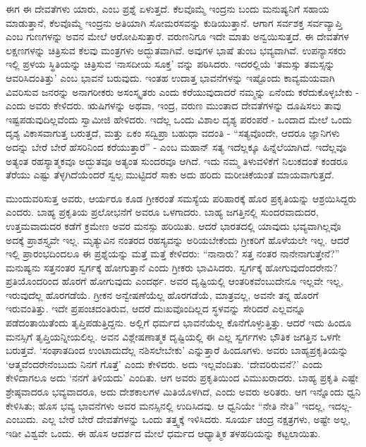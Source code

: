 \newpage

ಈಗ ಈ ದೇವತೆಗಳು ಯಾರು, ಎಂಬ ಪ್ರಶ್ನೆ ಏಳುತ್ತದೆ. ಕೆಲವೊಮ್ಮೆ ಇಂದ್ರನು ಬಂದು ಮನುಷ್ಯನಿಗೆ ಸಹಾಯ ಮಾಡುತ್ತಾನೆ, ಕೆಲವೊಮ್ಮೆ ಇಂದ್ರನು ಅತಿಯಾಗಿ ಸೋಮರಸವನ್ನು ಕುಡಿಯುತ್ತಾನೆ. ಆಗಾಗ ಸರ್ವಶಕ್ತ ಸರ್ವವ್ಯಾಪ್ತಿ ಎಂಬ ಗುಣಗಳನ್ನು ಅವನ ಮೇಲೆ ಆರೋಪಿಸುತ್ತಾರೆ. ವರುಣನಿಗೂ ಇದೇ ಮಾತು ಅನ್ವಯಿಸುತ್ತದೆ. ಈ ದೇವತೆಗಳ ಲಕ್ಷಣಗಳನ್ನು ಚಿತ್ರಿಸುವ ಕೆಲವು ಮಂತ್ರಗಳು ಅದ್ಭುತವಾಗಿವೆ. ಅವುಗಳ ಭಾಷೆ ತುಂಬ ಭವ್ಯವಾಗಿವೆ. ಉಪನ್ಯಾಸಕರು ಇಲ್ಲಿ ಪ್ರಳಯ ಸ್ಥಿತಿಯನ್ನು ಚಿತ್ರಿಸುವ ‘ನಾಸದೀಯ ಸೂಕ್ತ’ ವನ್ನು ಪಠಿಸಿದರು. ಇದರಲ್ಲಿಯೆ ‘ತಮಸ್ಸು ತಮಸ್ಸನ್ನು ಆವರಿಸಿದಂತಿತ್ತು’ ಎಂಬ ಭಾವನೆ ಬರುವುದು. ಇಂತಹ ಉದಾತ್ತ ಭಾವನೆಗಳನ್ನು ಇಷ್ಟೊಂದು ಕಾವ್ಯಮಯವಾಗಿ ವಿವರಿಸುವ ಜನರನ್ನು ಅನಾಗರೀಕರು ಅಸಂಸ್ಕೃತರು ಎಂದು ಕರೆಯುವುದಾದರೆ ನಮ್ಮನ್ನು ಏನೆಂದು ಕರೆದುಕೊಳ್ಳಬೇಕು - ಎಂದು ಅವರು ಕೇಳಿದರು. ಋಷಿಗಳನ್ನು ಅಥವಾ, ಇಂದ್ರ, ವರುಣ ಮುಂತಾದ ದೇವತೆಗಳನ್ನು ದೂಷಿಸಲು ತಾವು ಇಷ್ಟಪಡುವುದಿಲ್ಲವೆಂದು ಸ್ವಾಮೀಜಿ ಹೇಳಿದರು. ಇದೆಲ್ಲ ಒಂದು ವಿಶಾಲ ದೃಶ್ಯ ಪರಂಪರೆ - ಒಂದಾದ ಮೇಲೆ ಒಂದು ದೃಶ್ಯ ವಿಕಾಸವಾಗುತ್ತ ಬರುತ್ತದೆ, ಮತ್ತು ಏಕಂ ಸದ್ವಿಪ್ರಾ ಬಹುಧಾ ವದಂತಿ - “ಸತ್ಯವೊಂದೇ, ಆದರೂ ಜ್ಞಾನಿಗಳು ಅದನ್ನು ಬೇರೆ ಬೇರೆ ಹೆಸರಿನಿಂದ ಕರೆಯುತ್ತಾರೆ” - ಎಂಬ ಮಹಾನ್​ ಸತ್ಯ ಇದೆಲ್ಲಕ್ಕೂ ಹಿನ್ನೆಲೆಯಾಗಿದೆ. ಇದೆಲ್ಲವೂ ಅತ್ಯಂತ ರಹಸ್ಯಾತ್ಮಕವೂ ಅದ್ಭುತವೂ ಅತ್ಯಂತ ಸುಂದರವೂ ಆಗಿದೆ. ಇದು ನಮ್ಮ ತಿಳುವಳಿಕೆಗೆ ನಿಲುಕದಂತೆ ಕಂಡರೂ ತೆರೆಯು ಎಷ್ಟು ತೆಳ್ಳಗಿದೆಯೆಂದರೆ ಸ್ವಲ್ಪ ಮುಟ್ಟಿದರೆ ಸಾಕು ಅದು ಹರಿದು ಮರೀಚಿಕೆಯಂತೆ ಮಾಯವಾಗುತ್ತದೆ.

ಮುಂದುವರಿಸುತ್ತ ಅವರು, ಆರ್ಯರೂ ಕೂಡ ಗ್ರೀಕರಂತೆ ಸಮಸ್ಯೆಯ ಪರಿಹಾರಕ್ಕೆ ಹೊರ ಪ್ರಕೃತಿಯನ್ನು ಆಶ್ರಯಿಸಿದ್ದರು ಎಂದರು. ಬಾಹ್ಯ ಪ್ರಕೃತಿಯ ಪ್ರಲೋಭನೆಗೆ ಅವರೂ ಒಳಗಾದರು. ಬಾಹ್ಯ ಜಗತ್ತಿನಲ್ಲಿ ಸುಂದರವಾದುದರ, ಉತ್ತಮವಾದುದರ ಕಡೆಗೆ ಕ್ರಮೇಣ ಅವರ ಮನಸ್ಸು ಹರಿಯಿತು. ಆದರೆ ಭಾರತದಲ್ಲಿ ಯಾವುದು ಭವ್ಯವಾಗಿಲ್ಲವೊ ಅದಕ್ಕೆ ಪ್ರಾಶಸ್ತ್ಯವೇ ಇಲ್ಲ. ಮೃತ್ಯುವಿನ ನಂತರದ ರಹಸ್ಯವನ್ನು ಅರಿಯಬೇಕೆಂದು ಗ್ರೀಕರಿಗೆ ಹೊಳೆಯಲೇ ಇಲ್ಲ. ಆದರೆ ಇಲ್ಲಿ ಪ್ರಾರಂಭದಿಂದಲೂ ಈ ಪ್ರಶ್ನೆಯನ್ನು ಮತ್ತೆ ಮತ್ತೆ ಕೇಳಿದರು: “ನಾನಾರು? ಸತ್ತ ನಂತರ ನಾನೇನಾಗುತ್ತೇನೆ?” ಮನುಷ್ಯನು ಸತ್ತನಂತರ ಸ್ವರ್ಗಕ್ಕೆ ಹೋಗುತ್ತಾನೆ ಎಂದು ಗ್ರೀಕರು ಭಾವಿಸಿದರು. ಸ್ವರ್ಗಕ್ಕೆ ಹೋಗುವುದೆಂದರೇನು? ಪ್ರತಿಯೊಂದರಿಂದ ಹೊರಗೆ ಹೋಗುವುದು ಎಂದರ್ಥ. ಅವರ ದೃಷ್ಟಿಯಲ್ಲಿ ಆಂತರಿಕವೆಂಬುದೇನೂ ಇಲ್ಲವೇ ಇಲ್ಲ, ಇರುವುದೆಲ್ಲ ಹೊರಗಡೆಯೆ. ಗ್ರೀಕನ ಅನ್ವೇಷಣೆಯೆಲ್ಲ ಹೊರಗಡೆಯೆ, ಮಾತ್ರವಲ್ಲ, ಅವನೇ ತನ್ನ ಹೊರಗೆ ಇರುವಂತಿತ್ತು. ಇದೇ ಪ್ರಪಂಚದಂತಿರುವ, ಆದರೆ ದುಃಖವೊಂದಿಲ್ಲದ ಸ್ಥಳವನ್ನು ಸೇರಿದರೆ ಎಲ್ಲವನ್ನೂ ಪಡೆದಂತಾಯಿತೆಂದು ತೃಪ್ತಿಪಡುತ್ತಿದ್ದನು. ಅಲ್ಲಿಗೆ ಧರ್ಮದ ಭಾವನೆಯೆಲ್ಲ ಕೊನೆಗೊಳ್ಳುತ್ತಿತ್ತು. ಆದರೆ ಇದು ಹಿಂದೂ ಮನಸ್ಸಿಗೆ ತೃಪ್ತಿಯನ್ನೀಯಲಿಲ್ಲ. ಅವನ ವಿಶ್ಲೇಷಣಾತ್ಮಕ ದೃಷ್ಟಿಯಲ್ಲಿ ಈ ಎಲ್ಲ ಸ್ವರ್ಗಗಳು ಭೌತಿಕ ಜಗತ್ತಿನ ಒಳಗೇ ಬರುತ್ತವೆ. ‘ಸಂಘಾತದಿಂದ ಉಂಟಾದುದೆಲ್ಲ ನಶಿಸಲೇಬೇಕು’ ಎನ್ನುತ್ತಾರೆ ಹಿಂದೂಗಳು. ಅವರು ಬಾಹ್ಯಪ್ರಕೃತಿಯನ್ನು ‘ಆತ್ಮವೆಂದರೇನೆಂಬುದು ನಿನಗೆ ಗೊತ್ತೆ’ ಎಂದು ಕೇಳಿದರು. ಅದು ಇಲ್ಲವೆಂದಿತು. ‘ದೇವರಿರುವನೆ?’ ಎಂದು ಕೇಳಿದಾಗಲೂ ಅದು ‘ನನಗೆ ತಿಳಿಯದು’ ಎಂದಿತು. ಆಗ ಅವರು ಪ್ರಕೃತಿಯಿಂದ ವಿಮುಖರಾದರು. ಬಾಹ್ಯ ಪ್ರಕೃತಿ ಎಷ್ಟೇ ಶ್ರೇಷ್ಠವಾದರೂ ಭವ್ಯವಾದರೂ, ಅದು ದೇಶಕಾಲಗಳ ಮಿತಿಯೊಳಗಿದೆ, ಎಂದು ಅವರು ಅರಿತರು. ಆಗ ಇನ್ನೊಂದು ಧ್ವನಿ ಕೇಳಿಸಿತು; ಹೊಸ ಭವ್ಯ ಭಾವನೆಗಳು ಅವರ ಮನಸ್ಸಿನಲ್ಲಿ ಉದಿಸಿದವು. ಆ ಧ್ವನಿಯೇ “ನೇತಿ ನೇತಿ” ಇದಲ್ಲ, ಇದಲ್ಲ- ಎಂಬುದು. ಎಲ್ಲ ಬೇರೆ ಬೇರೆ ದೇವತೆಗಳನ್ನು ಒಂದು ತತ್ತ್ವಕ್ಕೆ ಇಳಿಸಿದರು. ಸೂರ್ಯ ಚಂದ್ರ ನಕ್ಷತ್ರಗಳು, ಅಷ್ಟೇ ಅಲ್ಲ, ಇಡೀ ವಿಶ್ವವೇ ಒಂದು. ಈ ಹೊಸ ಆದರ್ಶದ ಮೇಲೆ ಧರ್ಮದ ಆಧ್ಯಾತ್ಮಿಕ ತಳಹದಿಯನ್ನು ಕಟ್ಟಲಾಯಿತು.

